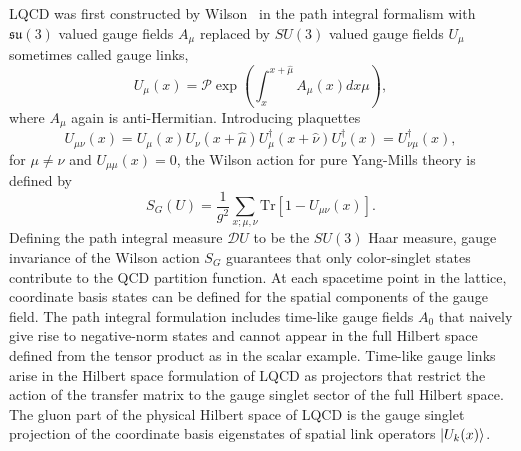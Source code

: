 LQCD was first constructed by Wilson~\cite{Wilson:1974sk} in the path integral formalism with $\mathfrak{su}(3)$ valued gauge fields $A_\mu$ replaced by $SU(3)$ valued gauge fields $U_\mu$ sometimes called gauge links,
\begin{equation}
  U_\mu(x) = \mathcal{P}\exp\left( \int_x^{x+\hat{\mu}} A_\mu(x)dx\mu \right),
\end{equation}
where $A_\mu$ again is anti-Hermitian.
Introducing plaquettes
\begin{equation}
  U_{\mu\nu}(x) = U_\mu(x)U_\nu(x+\hat{\mu})U_\mu^\dagger(x+\hat{\nu})U_\nu^\dagger(x) = U_{\nu\mu}^\dagger(x),
\end{equation}
for $\mu\neq\nu$ and $U_{\mu\mu}(x)=0$, the Wilson action for pure Yang-Mills theory is defined by
\begin{equation}
  S_G(U)  = \frac{1}{g^2}\sum_{x;\mu,\nu}\text{Tr} \left[ 1 - U_{\mu\nu}(x) \right].
\end{equation}
Defining the path integral measure $\mathcal{D}U$ to be the $SU(3)$ Haar measure, gauge invariance of the Wilson action $S_G$ guarantees that only color-singlet states contribute to the QCD partition function.
At each spacetime point in the lattice, coordinate basis states can be defined for the spatial components of the gauge field.
The path integral formulation includes time-like gauge fields $A_0$ that naively give rise to negative-norm states and cannot appear in the full Hilbert space defined from the tensor product as in the scalar example.
Time-like gauge links arise in the Hilbert space formulation of LQCD as projectors that restrict the action of the transfer matrix to the gauge singlet sector of the full Hilbert space.
The gluon part of the physical Hilbert space of LQCD is the gauge singlet projection of the coordinate basis eigenstates of spatial link operators $\left| U_k(x) \right>$.

